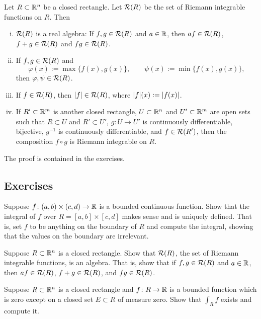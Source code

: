 \begin{cor} \label{cor:closednessofriemannintegrable}
Let $R \subset {\mathbb{R}}^n$ be a closed rectangle.  Let ${\mathcal{R}}(R)$ be the set
of Riemann integrable functions on $R$.  Then
\begin{enumerate}[(i)]
\item
${\mathcal{R}}(R)$ is a real algebra:
If $f,g \in {\mathcal{R}}(R)$ and $a \in {\mathbb{R}}$, then $af \in {\mathcal{R}}(R)$, $f+g \in {\mathcal{R}}(R)$
and $fg \in {\mathcal{R}}(R)$.
\item
If $f,g \in {\mathcal{R}}(R)$ and
\begin{equation*}
\varphi(x) := \max \bigl\{ f(x) , g(x) \bigr\} ,
\qquad
\psi(x) := \min \bigl\{ f(x) , g(x) \bigr\} ,
\end{equation*}
then $\varphi, \psi \in {\mathcal{R}}(R)$.
\item
If $f \in {\mathcal{R}}(R)$, then $\lvert {f} \rvert \in {\mathcal{R}}(R)$, where $\lvert {f} \rvert(x) :=
\lvert {f(x)} \rvert$.
\item
If $R' \subset {\mathbb{R}}^m$ is another closed rectangle,
$U \subset {\mathbb{R}}^n$ and $U' \subset {\mathbb{R}}^m$ are open sets such that
$R \subset U$ and $R' \subset U'$,
$g \colon U \to U'$ is continuously differentiable, bijective,
$g^{-1}$ is continuously differentiable,
and $f \in {\mathcal{R}}(R')$,
then the composition $f \circ g$ is Riemann integrable on $R$.
\end{enumerate}
\end{cor}

The proof is contained in the exercises.

\subsection{Exercises}

\begin{exercise}
Suppose $f \colon (a,b) \times (c,d) \to {\mathbb{R}}$ is a bounded continuous
function.  Show that the integral of $f$ over $R = [a,b] \times [c,d]$ makes sense
and is uniquely defined.  That is, set $f$ to be anything on the boundary of
$R$ and compute the integral, showing that the values on the boundary are
irrelevant.
\end{exercise}

\begin{exercise}
Suppose $R \subset {\mathbb{R}}^n$ is a closed rectangle.  Show that ${\mathcal{R}}(R)$, the set
of Riemann integrable functions, is an algebra.  That is, show that
if $f,g \in {\mathcal{R}}(R)$ and $a \in {\mathbb{R}}$, then $af \in {\mathcal{R}}(R)$, $f+g \in {\mathcal{R}}(R)$,
and $fg \in {\mathcal{R}}(R)$.
\end{exercise}

\begin{exercise}
Suppose $R \subset {\mathbb{R}}^n$ is a closed rectangle and
$f \colon R \to {\mathbb{R}}$ is a bounded function which is zero except on a closed set $E
\subset R$ of measure
zero.  Show that $\int_R f$ exists and compute it.
\end{exercise}

